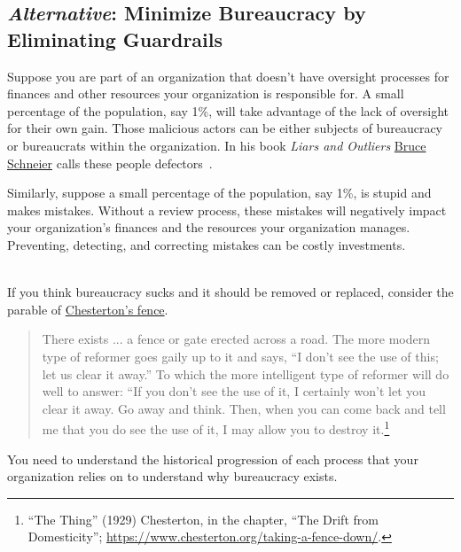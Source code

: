 \subsection*{\textit{Alternative}: Minimize Bureaucracy by Eliminating Guardrails}

Suppose  you are part of an organization that doesn't have oversight processes for finances and other resources your organization is responsible for. A small percentage of the population, say 1\%, will take advantage of the lack of oversight for their own gain. Those malicious actors can be either subjects of bureaucracy or bureaucrats within the organization. 
In his book \textit{Liars and Outliers} \href{https://en.wikipedia.org/wiki/Bruce_Schneier}{Bruce Schneier}
\iftoggle{WPinmargin}{\marginpar{$>$Wikipedia: Bruce Schneier}}{}
calls these people defectors~\cite{2012_Schneier}.

Similarly, suppose a small percentage of the population, say 1\%, is stupid and makes mistakes. Without a review process, these mistakes will negatively impact your organization's finances and the resources your organization manages. Preventing, detecting, and correcting mistakes can be costly investments. 

\ \\

If you think bureaucracy sucks and it should be removed or replaced,  consider the parable of 
\href{https://en.wikipedia.org/wiki/G._K._Chesterton\%23Chesterton\%27s_fence}{Chesterton's fence}. 
\label{concept:chestertons_fence}
\iftoggle{WPinmargin}{\marginpar{$>$Wikipedia: Chesterton's fence}}{}
\begin{quote}
There exists ... a fence or gate erected across a road. The more modern type of reformer goes gaily up to it and says, “I don’t see the use of this; let us clear it away.” To which the more intelligent type of reformer will do well to answer: “If you don’t see the use of it, I certainly won’t let you clear it away. Go away and think. Then, when you can come back and tell me that you do see the use of it, I may allow you to destroy it.\footnote{``The Thing'' (1929) Chesterton, in the chapter, ``The Drift from Domesticity''; \href{https://www.chesterton.org/taking-a-fence-down/}{https://www.chesterton.org/taking-a-fence-down/}.}
\end{quote}
You need to understand the historical progression of each process that your organization relies on to understand why bureaucracy exists.


